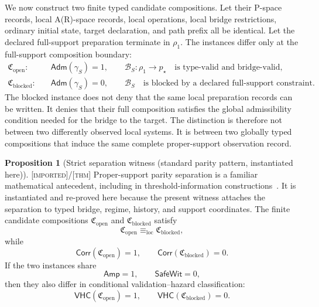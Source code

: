 \documentclass[11pt]{article}
\newcommand{\Thm}{\textsc{[thm]}}
\newcommand{\Imp}{\textsc{[imported]}}
\theoremstyle{definition}
\newtheorem{sproposition}{Proposition}
\begin{document}
We now construct two finite typed candidate compositions. Let their P-space
records, local A(R)-space records, local operations, local bridge restrictions,
ordinary initial state, target declaration, and path prefix all be identical. Let
the declared full-support preparation terminate in $\rho_1$. The instances differ
only at the full-support composition boundary:
\begin{align}
\mathfrak C_{\mathrm{open}}:\quad&
\mathsf{Adm}(\gamma_S)=1,
\qquad
\mathcal B_S:\rho_1\longrightarrow p_\star
\quad\text{is type-valid and bridge-valid},
\label{eq:open-composition}
\\[4pt]
\mathfrak C_{\mathrm{blocked}}:\quad&
\mathsf{Adm}(\gamma_S)=0,
\qquad
\mathcal B_S
\quad\text{is blocked by a declared full-support constraint}.
\label{eq:blocked-composition}
\end{align}
The blocked instance does not deny that the same local preparation records can
be written. It denies that their full composition satisfies the global
admissibility condition needed for the bridge to the target. The distinction is
therefore not between two differently observed local systems. It is between two
globally typed compositions that induce the same complete proper-support
observation record.

\begin{sproposition}[Strict separation witness (standard parity pattern, instantiated here)]
\label{prop:strict-separation-witness}
\Imp{}/\Thm{} Proper-support parity separation is a familiar mathematical
antecedent, including in threshold-information constructions~\cite{S_Shamir1979}.
It is instantiated and re-proved here because the present witness attaches the
separation to typed bridge, regime, history, and support coordinates. The finite
candidate compositions
$\mathfrak C_{\mathrm{open}}$ and $\mathfrak C_{\mathrm{blocked}}$ satisfy
\begin{equation}
\mathfrak C_{\mathrm{open}}
\equiv_{\mathrm{loc}}
\mathfrak C_{\mathrm{blocked}},
\label{eq:strict-local-equivalence}
\end{equation}
while
\begin{equation}
\mathsf{Corr}(\mathfrak C_{\mathrm{open}})=1,
\qquad
\mathsf{Corr}(\mathfrak C_{\mathrm{blocked}})=0.
\label{eq:strict-corridor-separation}
\end{equation}
If the two instances share
\begin{equation}
\mathsf{Amp}=1,
\qquad
\mathsf{SafeWit}=0,
\end{equation}
then they also differ in conditional validation--hazard classification:
\begin{equation}
\mathsf{VHC}(\mathfrak C_{\mathrm{open}})=1,
\qquad
\mathsf{VHC}(\mathfrak C_{\mathrm{blocked}})=0.
\label{eq:strict-hazard-separation}
\end{equation}
\end{sproposition}
\end{document}

